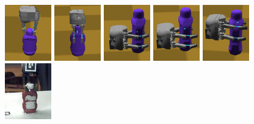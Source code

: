 \begin{figure}[!!hbt]
\begin{center}
{ \includegraphics[width=0.18\textwidth]     {images/ssoch/fig/heinz_P1}    \label{heinz_P1}}
{ \includegraphics[width=0.18\textwidth]     {images/ssoch/fig/heinz_P2}    \label{heinz_P2}}
{ \includegraphics[width=0.18\textwidth]     {images/ssoch/fig/heinz_P3}    \label{heinz_P3}}
{ \includegraphics[width=0.18\textwidth]     {images/ssoch/fig/heinz_P4}    \label{heinz_P4}}
{ \includegraphics[width=0.18\textwidth]     {images/ssoch/fig/heinz_P5}    \label{heinz_P5}}
{ \includegraphics[width=0.18\textwidth]    {images/ssoch/fig/heinz_p1_1}    \label{heinz_p1_1}}

\end{center}
\end{figure}
